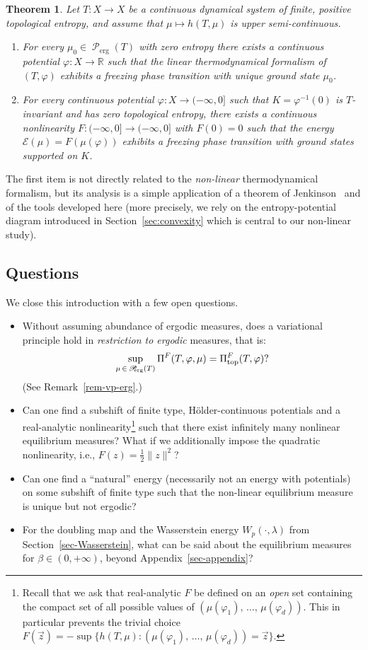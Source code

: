 \documentclass[AHL, Unicode, longabstracts,published]{cedram}
\theoremstyle{plain}
\newtheorem{theol}{Theorem}
\theoremstyle{plain}
\newcommand\Proberg{\Prob_{\kern-3pt\mathrm{erg}}}
\newcommand\erg{\mathrm{erg}}
\renewcommand\top{{\mathrm{top}}}
\newcommand\Prob{{\operatorname{\mathscr{P}}}}
\newcommand{\pot}{\varphi}
\newcommand*\8{\infty}
\newcommand\RR{\mathbb{R}}
\newcommand{\En}{\mathcal{E}}
\begin{document}
\begin{theol}\label{thm-fpt}
Let $T:X\to X$ be a continuous dynamical system of finite, positive topological entropy, and assume that $\mu\mapsto h(T,\mu)$ is upper semi-continuous.
\begin{enumerate}
\item For every $\mu_0\in\Prob_\erg(T)$ with zero entropy there exists a continuous potential $\pot:X\to \RR$ such that the \emph{linear} thermodynamical formalism of $(T,\pot)$ exhibits a freezing phase transition with unique ground state $\mu_0$.
\item For every continuous potential $\pot:X\to(-\infty,0]$ such that $K=\pot^{-1}(0)$ is $T$-invariant and has zero topological entropy, there exists a continuous nonlinearity $F : (-\infty,0]\to (-\infty,0]$ with $F(0)=0$ such that the energy $\En(\mu) = F(\mu(\pot))$ exhibits a freezing phase transition with ground states supported on $K$.
\end{enumerate}
\end{theol}

The first item is not directly related to the \emph{non-linear} thermodynamical formalism, but its analysis is a simple application of a theorem of Jenkinson~\cite{Jenkinson} and of the tools developed here (more precisely, we rely on the entropy-potential diagram introduced in Section~\ref{sec:convexity} which is central to our non-linear study).



\subsection{Questions}\label{subsec-questions}

We close this introduction with a few open questions.
\begin{itemize}
\item Without assuming abundance of ergodic measures, does a variational principle hold in \emph{restriction to ergodic} measures, that is:
\[
\sup_{\mu\,\in\,\Proberg(T)} \Pi^F(T,\pot,\mu) = \Pi^F_\top(T,\pot)?
\]
(See Remark~\ref{rem-vp-erg}.)
\item Can one find a subshift of finite type, H\"older-continuous potentials and a real-analytic nonlinearity\footnote{Recall that we ask that { real-analytic} $F$ be defined on an \emph{open} set containing the compact set of all possible values of $(\mu(\pot_1),\,\dots,\,\mu(\pot_d))$. This in particular prevents the trivial choice $F(\vec z) = -\sup\{h(T,\mu) \colon (\mu(\pot_1),\,\dots,\,\mu(\pot_d))=\vec z \}$.} such that there exist infinitely many nonlinear equilibrium measures? What if we additionally impose the quadratic nonlinearity, i.e., $F(z) = \frac12\lVert z\rVert^2$?
\item Can one find a ``natural'' energy {(necessarily not an energy with potentials) on some subshift of finite type} such that the non-linear equilibrium measure is unique but not ergodic?
\item { For the doubling map and the Wasserstein energy $W_p(\cdot,\lambda)$ from Section~\ref{sec-Wasserstein},} what can be said about the equilibrium measures for $\beta\in(0,+\infty)$, beyond Appendix~\ref{sec-appendix}?
\end{itemize}
\end{document}
